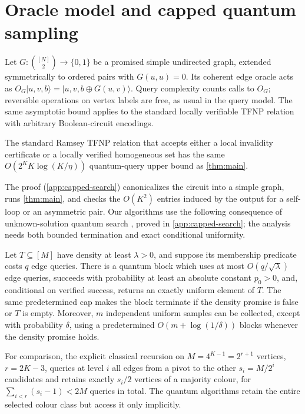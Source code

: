 \section{Oracle model and capped quantum sampling}\label{sec:model}

Let $G\colon\binom{[N]}2\to\{0,1\}$ be a promised simple undirected graph,
extended symmetrically to ordered pairs with $G(u,u)=0$.  Its coherent edge
oracle acts as
$O_G\lvert u,v,b\rangle=\lvert u,v,b\oplus G(u,v)\rangle$.
Query complexity counts calls to $O_G$; reversible operations on vertex
labels are free, as usual in the query model.  The same asymptotic bound
applies to the standard locally verifiable TFNP relation with arbitrary
Boolean-circuit encodings.

\begin{corollary}
\label{cor:unpromised}
The standard Ramsey TFNP relation that accepts either a local invalidity
certificate or a locally verified homogeneous set has the same
$O(2^K K\log(K/\eta))$ quantum-query upper bound as \cref{thm:main}.
\end{corollary}

The proof (\cref{app:capped-search}) canonicalizes the circuit into a
simple graph, runs \cref{thm:main}, and checks the $O(K^2)$ entries induced
by the output for a self-loop or an asymmetric pair.  Our algorithms use
the following consequence of unknown-solution quantum search
\cite{BBHT1998}, proved in \cref{app:capped-search}; the analysis needs
both bounded termination and exact conditional uniformity.

\begin{lemma}\label{lem:capped-search}
Let $T\subseteq[M]$ have density at least $\lambda>0$, and suppose its
membership predicate costs $q$ edge queries.  There is a quantum block which
uses at most $O(q/\sqrt\lambda)$ edge queries, succeeds with probability at
least an absolute constant $p_0>0$, and, conditional on verified success,
returns an exactly uniform element of $T$.  The same predetermined cap makes
the block terminate if the density promise is false or $T$ is empty.
Moreover, $m$ independent uniform samples can be collected, except with
probability $\delta$, using a predetermined
$O(m+\log(1/\delta))$ blocks whenever the density promise holds.
\end{lemma}

For comparison, the explicit classical recursion on $M=4^{K-1}=2^{r+1}$
vertices, $r=2K-3$, queries at level $i$ all edges from a pivot to the other
$s_i=M/2^i$ candidates and retains exactly $s_i/2$ vertices of a majority
colour, for $\sum_{i<r}(s_i-1)<2M$ queries in total.  The quantum algorithms
retain the entire selected colour class but access it only implicitly.
